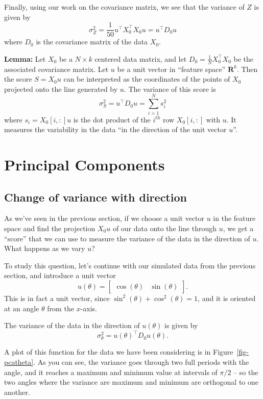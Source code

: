 \documentclass[
  11pt,
  letterpaper,
]{scrbook}
\theoremstyle{plain}
\theoremstyle{plain}
\theoremstyle{remark}
\begin{document}
Finally, using our work on the covariance matrix, we see that the
variance of \(Z\) is given by \[
\sigma_{Z}^2 = \frac{1}{50}u^{\intercal}X_{0}^{\intercal}X_{0}u = u^{\intercal}D_{0}u
\] where \(D_{0}\) is the covariance matrix of the data \(X_{0}\).

\textbf{Lemma:} Let \(X_{0}\) be a \(N\times k\) centered data matrix,
and let \(D_{0}=\frac{1}{N}X_{0}^{\intercal}X_{0}\) be the associated
covariance matrix. Let \(u\) be a unit vector in ``feature space''
\(\mathbf{R}^{k}\). Then the score \(S=X_{0}u\) can be interpreted as
the coordinates of the points of \(X_{0}\) projected onto the line
generated by \(u\). The variance of this score is \[
\sigma^{2}_{S} = u^{\intercal}D_{0}u = \sum_{i=1}^{N} s_{i}^2
\] where \(s_{i} = X_{0}[i,:]u\) is the dot product of the \(i^{th}\)
row \(X_{0}[i,:]\) with \(u\). It measures the variability in the data
``in the direction of the unit vector \(u\)''.

\hypertarget{principal-components}{%
\section{Principal Components}\label{principal-components}}

\hypertarget{change-of-variance-with-direction}{%
\subsection{Change of variance with
direction}\label{change-of-variance-with-direction}}

As we've seen in the previous section, if we choose a unit vector \(u\)
in the feature space and find the projection \(X_{0}u\) of our data onto
the line through \(u\), we get a ``score'' that we can use to measure
the variance of the data in the direction of \(u\). What happens as we
vary \(u\)?

To study this question, let's continue with our simulated data from the
previous section, and introduce a unit vector \[
u(\theta) = \left[\begin{matrix} \cos(\theta) & \sin(\theta)\end{matrix}\right].
\] This is in fact a unit vector, since
\(\sin^2(\theta)+\cos^2(\theta)=1\), and it is oriented at an angle
\(\theta\) from the \(x\)-axis.

The variance of the data in the direction of \(u(\theta)\) is given by
\[
\sigma_{\theta}^2 = u(\theta)^{\intercal}D_{0}u(\theta).
\]

A plot of this function for the data we have been considering is in
Figure~\ref{fig-pcatheta}. As you can see, the variance goes through two
full periods with the angle, and it reaches a maximum and minimum value
at intervals of \(\pi/2\) -- so the two angles where the variance are
maximum and minimum are orthogonal to one another.
\end{document}

